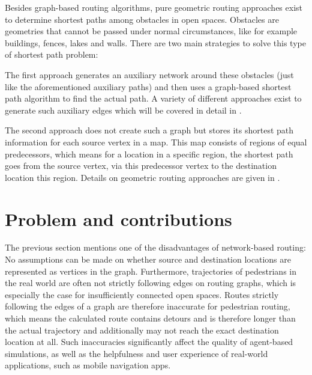 	Besides graph-based routing algorithms, pure geometric routing approaches exist to determine shortest paths among obstacles in open spaces.
	Obstacles are geometries that cannot be passed under normal circumstances, like for example buildings, fences, lakes and walls.
	There are two main strategies to solve this type of shortest path problem\cite{hershberger-suri}:
	
	The first approach generates an auxiliary network around these obstacles (just like the aforementioned auxiliary paths) and then uses a graph-based shortest path algorithm to find the actual path.
	A variety of different approaches exist to generate such auxiliary edges\cite{graser-osm-open-spaces} which will be covered in detail in .
	
	The second approach does not create such a graph but stores its shortest path information for each source vertex in a map.
	This map consists of regions of equal predecessors, which means for a location in a specific region, the shortest path goes from the source vertex, via this predecessor vertex to the destination location this region.
	Details on geometric routing approaches are given in .
	
\section{Problem and contributions}

	The previous section mentions one of the disadvantages of network-based routing:
	No assumptions can be made on whether source and destination locations are represented as vertices in the graph.
	Furthermore, trajectories of pedestrians in the real world are often not strictly following edges on routing graphs, which is especially the case for insufficiently connected open spaces.
	Routes strictly following the edges of a graph are therefore inaccurate for pedestrian routing\cite{graser-osm-open-spaces}, which means the calculated route contains detours and is therefore longer than the actual trajectory and additionally may not reach the exact destination location at all.
	Such inaccuracies significantly affect the quality of agent-based simulations, as well as the helpfulness and user experience of real-world applications, such as mobile navigation apps.


